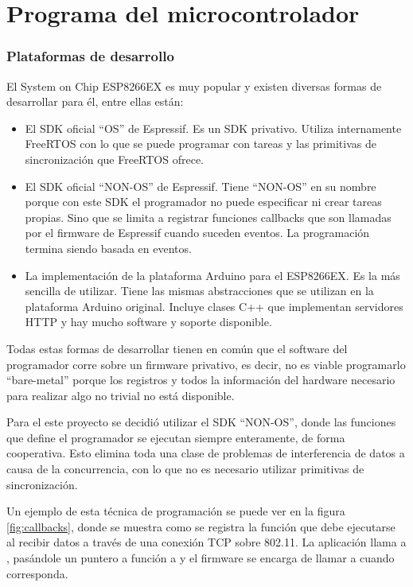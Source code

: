 \newpage
\section{Programa del microcontrolador} \label{sec:sw-implementacion}

\subsubsection{Plataformas de desarrollo}\label{sec:sdk}
El System on Chip ESP8266EX es muy popular y existen diversas formas de desarrollar para él, entre ellas están:
\begin{itemize}
	\item El SDK oficial \enquote{OS} de Espressif. Es un SDK privativo. Utiliza internamente FreeRTOS con lo que se puede programar con tareas y las primitivas de sincronización que FreeRTOS ofrece.
	\item El SDK oficial \enquote{NON-OS} de Espressif. Tiene \enquote{NON-OS} en su nombre porque con este SDK el programador no puede especificar ni crear tareas propias. Sino que se limita a registrar funciones callbacks que son llamadas por el firmware de Espressif cuando suceden eventos. La programación termina siendo basada en eventos.
	\item La implementación de la plataforma Arduino para el ESP8266EX. Es la más sencilla de utilizar. Tiene las mismas abstracciones que se utilizan en la plataforma Arduino original. Incluye clases C++ que implementan servidores HTTP y hay mucho software y soporte disponible.
\end{itemize}

Todas estas formas de desarrollar tienen en común que el software del programador corre sobre un firmware privativo, es decir, no es viable programarlo \enquote{bare-metal} porque los registros y todos la información del hardware necesario para realizar algo no trivial no está disponible.

Para el este proyecto se decidió utilizar el SDK \enquote{NON-OS}, donde las funciones que define el programador se ejecutan siempre enteramente, de forma cooperativa. Esto elimina toda una clase de problemas de interferencia de datos a causa de la concurrencia, con lo que no es necesario utilizar primitivas de sincronización.

Un ejemplo de esta técnica de programación se puede ver en la figura \ref{fig:callbacks}, donde se muestra como se registra la función que debe ejecutarse al recibir datos a través de una conexión TCP sobre 802.11. La aplicación llama a , pasándole un puntero a función a  y el firmware se encarga de llamar a  cuando corresponda.

